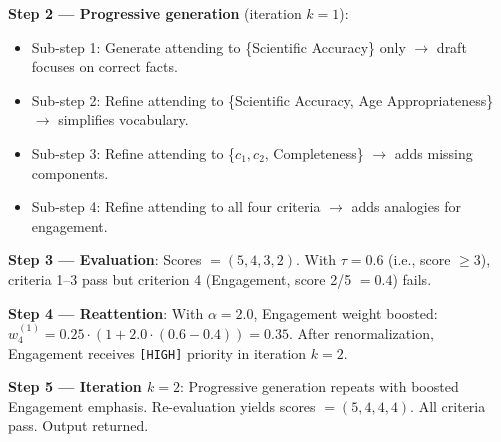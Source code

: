 \documentclass[11pt]{article}
\begin{document}
\textbf{Step 2 --- Progressive generation} (iteration $k=1$):
\begin{itemize}
    \item Sub-step 1: Generate attending to \{Scientific Accuracy\} only $\rightarrow$ draft focuses on correct facts.
    \item Sub-step 2: Refine attending to \{Scientific Accuracy, Age Appropriateness\} $\rightarrow$ simplifies vocabulary.
    \item Sub-step 3: Refine attending to \{$c_1, c_2$, Completeness\} $\rightarrow$ adds missing components.
    \item Sub-step 4: Refine attending to all four criteria $\rightarrow$ adds analogies for engagement.
\end{itemize}

\textbf{Step 3 --- Evaluation}: Scores $= (5, 4, 3, 2)$. With $\tau = 0.6$ (i.e., score $\geq 3$), criteria 1--3 pass but criterion 4 (Engagement, score 2/5 $= 0.4$) fails.

\textbf{Step 4 --- Reattention}: With $\alpha = 2.0$, Engagement weight boosted: $w_4^{(1)} = 0.25 \cdot (1 + 2.0 \cdot (0.6 - 0.4)) = 0.35$. After renormalization, Engagement receives \texttt{[HIGH]} priority in iteration $k=2$.

\textbf{Step 5 --- Iteration $k=2$}: Progressive generation repeats with boosted Engagement emphasis. Re-evaluation yields scores $= (5, 4, 4, 4)$. All criteria pass. Output returned.
\end{document}
